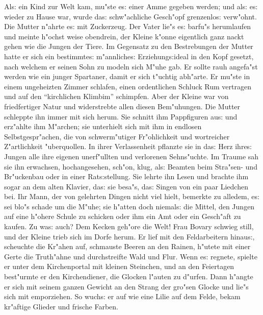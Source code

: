 \documentclass[oneside,12pt]{book}
\newcommand{\s}{s:}%
\begin{document}
Al{\s} ein Kind zur Welt kam, mu"ste e{\s} einer Amme gegeben
werden; und al{\s} e{\s} wieder zu Hause war, wurde da{\s}
schw"achliche Gesch"opf grenzenlo{\s} verw"ohnt. Die Mutter
n"ahrte e{\s} mit Zuckerzeug. Der Vater lie"s e{\s} barfu"s
herumlaufen und meinte h"ochst weise obendrein, der Kleine k"onne
eigentlich ganz nackt gehen wie die Jungen der Tiere. Im Gegensatz
zu den Bestrebungen der Mutter hatte er sich ein bestimmte{\s}
m"annliche{\s} Erziehung{\s}ideal in den Kopf gesetzt, nach
welchem er seinen Sohn zu modeln sich M"uhe gab. Er sollte rauh
angefa"st werden wie ein junger Spartaner, damit er sich t"uchtig
abh"arte. Er mu"ste in einem ungeheizten Zimmer schlafen, einen
ordentlichen Schluck Rum vertragen und auf den "`kirchlichen
Klimbim"' schimpfen. Aber der Kleine war von friedfertiger Natur
und widerstrebte allen diesen Bem"uhungen. Die Mutter schleppte
ihn immer mit sich herum. Sie schnitt ihm Pappfiguren au{\s} und
erz"ahlte ihm M"archen; sie unterhielt sich mit ihm in endlosen
Selbstgespr"achen, die von schwerm"utiger Fr"ohlichkeit und
wortreicher Z"artlichkeit "uberquollen. In ihrer Verlassenheit
pflanzte sie in da{\s} Herz ihre{\s} Jungen alle ihre eigenen
unerf"ullten und verlorenen Sehns"uchte. Im Traume sah sie ihn
erwachsen, hochangesehen, sch"on, klug, al{\s} Beamten beim
Stra"sen- und Br"uckenbau oder in einer Rat{\s}stellung. Sie
lehrte ihn Lesen und brachte ihm sogar an dem alten Klavier,
da{\s} sie besa"s, da{\s} Singen von ein paar Liedchen bei. Ihr
Mann, der von gelehrten Dingen nicht viel hielt, bemerkte zu
alledem, e{\s} sei blo"s schade um die M"uhe; sie h"atten doch
niemal{\s} die Mittel, den Jungen auf eine h"ohere Schule zu
schicken oder ihm ein Amt oder ein Gesch"aft zu kaufen. Zu wa{\s}
auch? Dem Kecken geh"ore die Welt! Frau Bovary schwieg still, und
der Kleine trieb sich im Dorfe herum. Er lief mit den
Feldarbeitern hinau{\s}, scheuchte die Kr"ahen auf, schmauste
Beeren an den Rainen, h"utete mit einer Gerte die Truth"ahne und
durchstreifte Wald und Flur. Wenn e{\s} regnete, spielte er unter
dem Kirchenportal mit kleinen Steinchen, und an den Feiertagen
best"urmte er den Kirchendiener, die Glocken l"auten zu d"urfen.
Dann h"angte er sich mit seinem ganzen Gewicht an den Strang der
gro"sen Glocke und lie"s sich mit emporziehen. So wuch{\s} er auf
wie eine Lilie auf dem Felde, bekam kr"aftige Glieder und frische
Farben.
\end{document}
